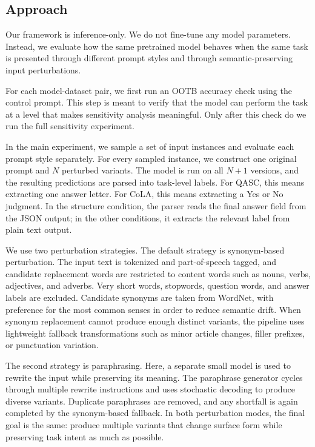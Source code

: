 \documentclass[11pt]{article}
\begin{document}
\subsection{Approach}

Our framework is inference-only. We do not fine-tune any model parameters. Instead, we evaluate how the same pretrained model behaves when the same task is presented through different prompt styles and through semantic-preserving input perturbations.

For each model-dataset pair, we first run an OOTB accuracy check using the control prompt. This step is meant to verify that the model can perform the task at a level that makes sensitivity analysis meaningful. Only after this check do we run the full sensitivity experiment.

In the main experiment, we sample a set of input instances and evaluate each prompt style separately. For every sampled instance, we construct one original prompt and $N$ perturbed variants. The model is run on all $N+1$ versions, and the resulting predictions are parsed into task-level labels. For QASC, this means extracting one answer letter. For CoLA, this means extracting a Yes or No judgment. In the structure condition, the parser reads the final answer field from the JSON output; in the other conditions, it extracts the relevant label from plain text output.

We use two perturbation strategies. The default strategy is synonym-based perturbation. The input text is tokenized and part-of-speech tagged, and candidate replacement words are restricted to content words such as nouns, verbs, adjectives, and adverbs. Very short words, stopwords, question words, and answer labels are excluded. Candidate synonyms are taken from WordNet, with preference for the most common senses in order to reduce semantic drift. When synonym replacement cannot produce enough distinct variants, the pipeline uses lightweight fallback transformations such as minor article changes, filler prefixes, or punctuation variation.

The second strategy is paraphrasing. Here, a separate small model is used to rewrite the input while preserving its meaning. The paraphrase generator cycles through multiple rewrite instructions and uses stochastic decoding to produce diverse variants. Duplicate paraphrases are removed, and any shortfall is again completed by the synonym-based fallback. In both perturbation modes, the final goal is the same: produce multiple variants that change surface form while preserving task intent as much as possible.
\end{document}

